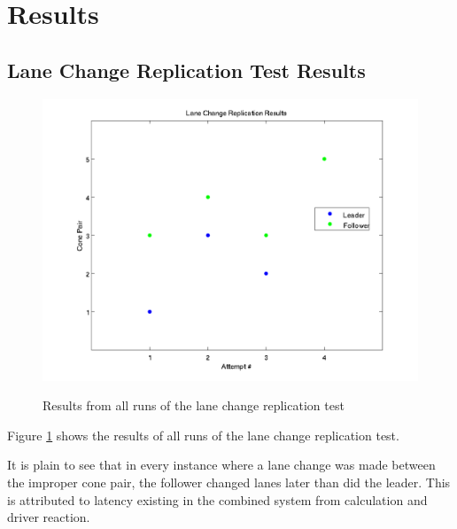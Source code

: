 \documentclass[12pt]{report}
\begin{document}


\section{Results} \label{sec:results}

\subsection{Lane Change Replication Test Results} \label{sec:lanechangetestresults}

\begin{figure}[ht] \centering \label{fig:lanechangeresults}
    \includegraphics[width=6.5in]{./figs/lane_change_results.png}
    \caption{Results from all runs of the lane change replication test}
\end{figure}

Figure \ref{fig:lanechangeresults} shows the results of all runs of the lane change replication test.

It is plain to see that in every instance where a lane change was made between the improper cone pair, the follower changed lanes later than did the leader. This is attributed to latency existing in the combined system from calculation and driver reaction.
\end{document}
